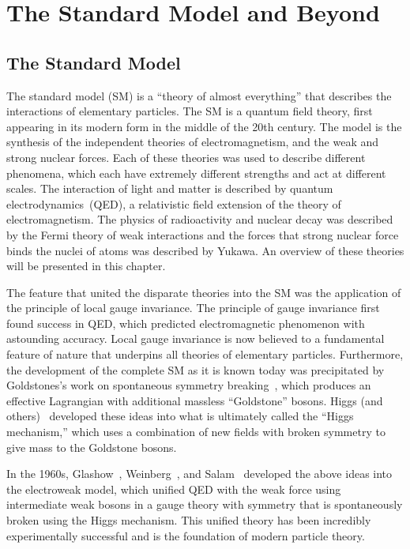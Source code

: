 \ifx\master\undefined\fi

\chapter{The Standard Model and Beyond}
\label{ch:theory}

\section{The Standard Model}
%
The standard model (SM) is a ``theory of almost everything'' that describes the
interactions of elementary particles.  The SM is a quantum
field theory, first appearing in its modern form in the middle of the 20th
century.  The model is the synthesis of the independent theories of
electromagnetism, and the weak and strong nuclear forces.  Each of these
theories was used to describe different phenomena, which each have extremely
different strengths and act at different scales.  The interaction of light and
matter is described by quantum electrodynamics~(QED), a relativistic field
extension of the theory of electromagnetism.  The physics of radioactivity and
nuclear decay was described by the Fermi theory of weak interactions and the
forces that strong nuclear force binds the nuclei of atoms was described by
Yukawa.  An overview of these theories will be presented in this chapter.  

The feature that united the disparate theories into the SM was the
application of the principle of local gauge invariance. The principle of
gauge invariance first found success in QED, which predicted electromagnetic
phenomenon with astounding accuracy.  Local gauge invariance is now believed to
a fundamental feature of nature that underpins all theories of elementary
particles.  Furthermore, the development of the complete SM as it is
known today was precipitated by Goldstones's work on spontaneous symmetry
breaking~\cite{Goldstone:1961eq,PhysRev.127.965}, which produces an effective
Lagrangian with additional massless ``Goldstone'' bosons.  Higgs (and
others)~\cite{PhysRevLett.13.321, PhysRevLett.13.508,PhysRevLett.13.585}
developed these ideas into what is ultimately called the ``Higgs mechanism,''
which uses a combination of new fields with broken symmetry to give mass to the
Goldstone bosons.

In the 1960s, Glashow~\cite{Glashow:1961tr}, Weinberg~\cite{Weinberg:1967tq}, 
and Salam~\cite{Salam:1968rm} developed the above ideas into the
electroweak model, which unified QED with the weak force using intermediate weak
bosons in a gauge theory with symmetry that is spontaneously broken using the Higgs
mechanism.  This unified theory has been incredibly experimentally successful
and is the foundation of modern particle theory.

